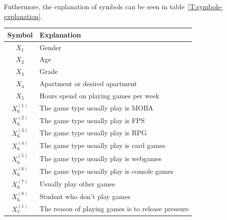 \documentclass[scheme=plain]{ctexart}
\begin{document}
Futhermore, the explanation of symbols can be seen in table~\ref{T:symbols-explanation}.
\begin{table}[H]
        \centering
        \begin{tabularx}{.8\textwidth}{cX}
                \toprule
                Symbol                                 & Explanation                                                      \\ \midrule
                \rowcolor[HTML]{EFEFEF} $X_{1}$        & Gender                                                           \\
                                        $X_{2}$        & Age                                                              \\
                \rowcolor[HTML]{EFEFEF} $X_{3}$        & Grade                                                            \\
                                        $X_{4}$        & Apartment or desired apartment                                   \\
                \rowcolor[HTML]{EFEFEF} $X_{5}$        & Hours spend on playing games per week                            \\
                                        $X_{6}^{(1)}$  & The game type usually play is MOBA                               \\
                \rowcolor[HTML]{EFEFEF} $X_{6}^{(2)}$  & The game type usually play is FPS                                \\
                                        $X_{6}^{(3)}$  & The game type usually play is RPG                                \\
                \rowcolor[HTML]{EFEFEF} $X_{6}^{(4)}$  & The game type usually play is card games                         \\
                                        $X_{6}^{(5)}$  & The game type usually play is webgames                           \\
                \rowcolor[HTML]{EFEFEF} $X_{6}^{(6)}$  & The game type usually play is console games                      \\
                                        $X_{6}^{(7)}$  & Usually play other games                                         \\
                \rowcolor[HTML]{EFEFEF} $X_{6}^{(8)}$  & Student who don't play games                                     \\
                                        $X_{7}^{(1)}$  & The reason of playing games is to release pressure               \\

\end{tabularx}
\end{table}
\end{document}
